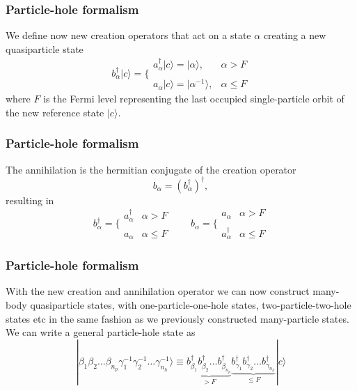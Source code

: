 \documentclass[compress]{beamer}
\newcommand*{\ket}[1]{|#1\rangle}
\begin{document}
\frame
{
  \frametitle{Particle-hole formalism}
\begin{small}
{\scriptsize
We define now new creation operators that act on a state $\alpha$ creating a new quasiparticle state
\begin{equation}
	b_\alpha^\dagger\ket{c} = \Bigg\{ \begin{array}{ll}
		a_\alpha^\dagger \ket{c} = \ket{\alpha}, & \alpha > F \\
		\\
		a_\alpha \ket{c} = \ket{\alpha^{-1}}, & \alpha \leq F
	\end{array} \label{eq:2-52}
\end{equation}
where $F$ is the Fermi level representing the last  occupied single-particle orbit 
of the new reference state $\ket{c}$. 
}
\end{small}
}


\frame
{
  \frametitle{Particle-hole formalism}
\begin{small}
{\scriptsize
The annihilation is the hermitian conjugate of the creation operator
\[
	b_\alpha = (b_\alpha^\dagger)^\dagger,
\]
resulting in
\begin{equation}
	b_\alpha^\dagger = \Bigg\{ \begin{array}{ll}
		a_\alpha^\dagger & \alpha > F \\
		\\
		a_\alpha & \alpha \leq F
	\end{array} \qquad 
	b_\alpha = \Bigg\{ \begin{array}{ll}
		a_\alpha & \alpha > F \\
		\\
		 a_\alpha^\dagger & \alpha \leq F
	\end{array} \label{eq:2-54}
\end{equation}
}
\end{small}
}


\frame
{
  \frametitle{Particle-hole formalism}
\begin{small}
{\scriptsize
With the new creation and annihilation operator  we can now construct 
many-body quasiparticle states, with one-particle-one-hole states, two-particle-two-hole
states etc in the same fashion as we previously constructed many-particle states. 
We can write a general particle-hole state as
\begin{equation}
	\ket{\beta_1\beta_2\dots \beta_{n_p} \gamma_1^{-1} \gamma_2^{-1} \dots \gamma_{n_h}^{-1}} \equiv
		\underbrace{b_{\beta_1}^\dagger b_{\beta_2}^\dagger \dots b_{\beta_{n_p}}^\dagger}_{>F}
		\underbrace{b_{\gamma_1}^\dagger b_{\gamma_2}^\dagger \dots b_{\gamma_{n_h}}^\dagger}_{\leq F} \ket{c}
		\label{eq:2-56}
\end{equation}
}
\end{small}
}
\end{document}
